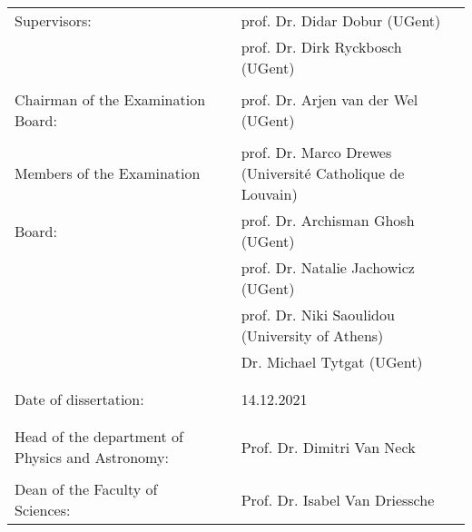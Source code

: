 

\begin{table}[t!]
    \vspace*{0.4\textheight}
\end{table}

\begin{table}[b!]
\begin{tabular}{p{}p{}p{}}
    Supervisors: &  &prof. Dr. Didar Dobur (UGent)\\
    &  &prof. Dr. Dirk Ryckbosch (UGent)\\ \\

    Chairman of the Examination Board: &  &prof. Dr. Arjen van der
                                             Wel (UGent)
  \\ \\
    Members of the Examination & &prof. Dr. Marco Drewes (Université Catholique de Louvain) \\
    Board: &  &prof. Dr. Archisman Ghosh (UGent) \\
    &  &prof. Dr. Natalie Jachowicz (UGent)\\
    &  &prof. Dr. Niki Saoulidou (University of Athens) \\
    &  &Dr. Michael Tytgat (UGent)  \\ \\ \\
   
    Date of dissertation: &  &14.12.2021 \\ \\ \\
Head of the department of Physics and Astronomy: & &
                                                       Prof. Dr. Dimitri Van Neck\\ \\
    Dean of the Faculty of Sciences: &  &Prof. Dr. Isabel Van Driessche 
    
\end{tabular}
\vspace*{-1.8\baselineskip}
\end{table}
\clearpage

